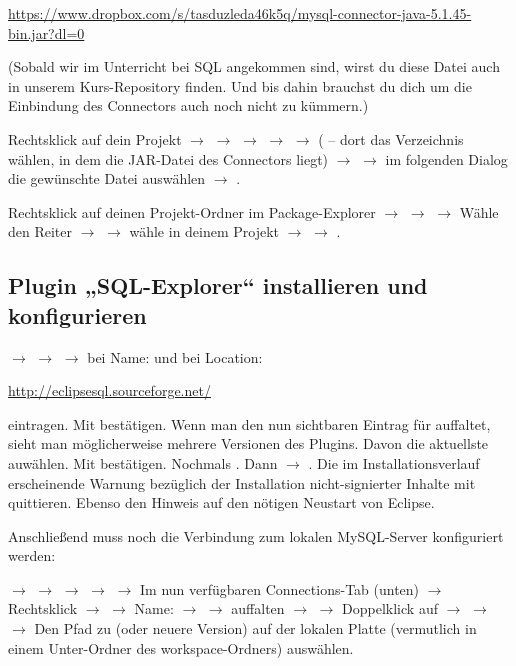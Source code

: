 \url{https://www.dropbox.com/s/tasduzleda46k5q/mysql-connector-java-5.1.45-bin.jar?dl=0}

(Sobald wir im Unterricht bei SQL angekommen sind, wirst du diese Datei auch in
unserem Kurs-Repository finden. Und bis dahin brauchst du dich um die
Einbindung des Connectors auch noch nicht zu kümmern.)

Rechtsklick auf dein Projekt $\rightarrow$  $\rightarrow$
 $\rightarrow$  $\rightarrow$ 
$\rightarrow$  ( -- dort das Verzeichnis
wählen, in dem die JAR-Datei des Connectors liegt) $\rightarrow$ 
$\rightarrow$ im folgenden Dialog die gewünschte Datei auswählen $\rightarrow$
.

Rechtsklick auf deinen Projekt-Ordner im Package-Explorer $\rightarrow$
 $\rightarrow$ 
$\rightarrow$ Wähle den Reiter  $\rightarrow$  $\rightarrow$ wähle  in
deinem Projekt $\rightarrow$  $\rightarrow$ .

\subsection{Plugin „SQL-Explorer“ installieren und konfigurieren}

 $\rightarrow$  $\rightarrow$
 $\rightarrow$ bei Name:  und bei Location:

\url{http://eclipsesql.sourceforge.net/} 

eintragen. Mit  bestätigen. Wenn man den nun sichtbaren Eintrag für
 auffaltet, sieht man möglicherweise mehrere Versionen des
Plugins. Davon die aktuellste auwählen. Mit  bestätigen. Nochmals
. Dann 
$\rightarrow$ . Die im Installationsverlauf erscheinende Warnung
bezüglich der Installation nicht-signierter Inhalte mit  quittieren.
Ebenso den Hinweis auf den nötigen Neustart von Eclipse.

Anschließend muss noch die Verbindung zum lokalen MySQL-Server konfiguriert
werden:

 $\rightarrow$  $\rightarrow$  $\rightarrow$  $\rightarrow$ 
$\rightarrow$  Im nun verfügbaren Connections-Tab (unten)
$\rightarrow$ Rechtsklick $\rightarrow$ 
$\rightarrow$ Name:  $\rightarrow$  $\rightarrow$  auffalten $\rightarrow$  $\rightarrow$ Doppelklick auf   $\rightarrow$
 $\rightarrow$  $\rightarrow$
Den Pfad zu  (oder neuere Version)
auf der lokalen Platte (vermutlich in einem Unter-Ordner des workspace-Ordners)
auswählen.

